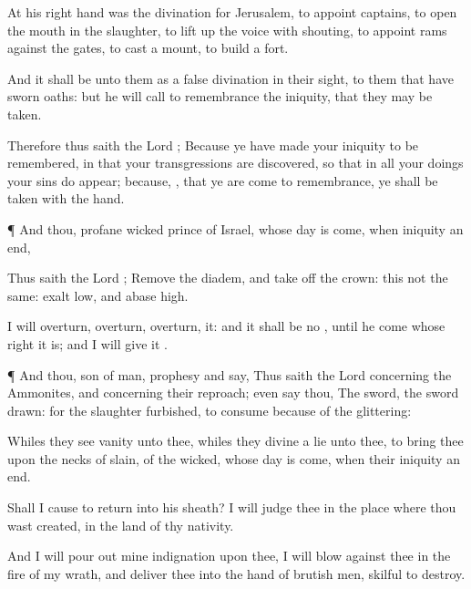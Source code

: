 {At his right
hand was the
divination for
Jerusalem, to
appoint
captains, to
open the
mouth in the
slaughter, to lift
up the
voice with
shouting, to
appoint
{}
rams against the
gates, to
cast a
mount,
{} to
build a
fort.

And it shall be unto them as a
false
divination in their
sight, to them that have
sworn
oaths: but he will call to
remembrance the
iniquity, that they may be
taken.

Therefore thus
saith the
Lord
{}; Because ye have made your
iniquity to be
remembered, in that your
transgressions are
discovered, so that in all your
doings your
sins do
appear; because,
{}, that ye are come to
remembrance, ye shall be
taken with the
hand.


\par }{\PP {}¶ And thou,
profane
wicked
prince of
Israel, whose
day is
come,
when
iniquity
{} an
end,

Thus
saith the
Lord
{};
Remove the
diadem, and take
off the
crown: this
{} not
{} the
same:
exalt
{}
low, and
abase
{}
high.

I will
overturn,
overturn,
overturn, it: and it shall
be no
{}, until he
come whose
right it is; and I will
give it
{}.


\par }{\PP {}¶ And thou,
son of
man,
prophesy and
say, Thus
saith the
Lord
{} concerning the
Ammonites, and concerning their
reproach; even
say thou, The
sword, the
sword
{}
drawn: for the
slaughter
{}
furbished, to
consume because of the
glittering:

Whiles they
see
vanity unto thee, whiles they
divine a
lie unto thee, to
bring thee upon the
necks of
{}
slain, of the
wicked, whose
day is
come,
when their
iniquity
{} an
end.

Shall I cause
{} to
return into his
sheath? I will
judge thee in the
place where thou wast
created, in the
land of thy
nativity.

And I will pour
out mine
indignation upon thee, I will
blow against thee in the
fire of my
wrath, and
deliver thee into the
hand of
brutish
men,
{}
skilful to
destroy.

}
